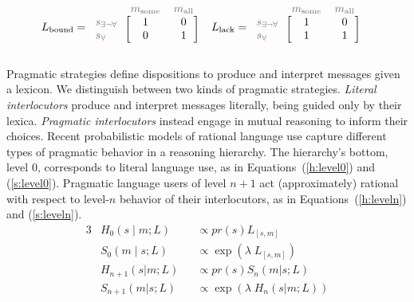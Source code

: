 \documentclass[a4paper, 11pt]{article}
\theoremstyle{Satz}
\newcommand{\state}{\ensuremath{s}\xspace}		%
\newcommand{\mystate}[1]{\ensuremath{\state_{\text{#1}}}\xspace} %
\newcommand{\mylang}[1]{\ensuremath{L_{\text{#1}}}\xspace} %
\newcommand{\messg}{\ensuremath{m}\xspace}		%
\newcommand{\mymessg}[1]{\ensuremath{\messg_{\text{#1}}}\xspace} %
\newcommand{\ssome}{\mystate{\ensuremath{\exists\neg\forall}}}
\newcommand{\sall}{\mystate{\ensuremath{\forall}}}
\newcommand{\msome}{\mymessg{some}}
\newcommand{\mall}{\mymessg{all}}
\newcommand{\Lbound}{\mylang{bound}}
\newcommand{\Llack}{\mylang{lack}}
\newcommand{\mygray}[1]{{\textcolor{mygray}{#1}}}
\begin{document}
\begin{align*}
  \Lbound & = \begin{blockarray}{lcc}
    & \mygray{\msome} & \mygray{\mall} \\
    \begin{block}{l[cc]}
      \mygray{\ssome} & 1 & 0 \\
      \mygray{\sall}  & 0 & 1 \\
    \end{block}
  \end{blockarray} &
  \Llack & = \begin{blockarray}{lcc}
    & \mygray{\msome} & \mygray{\mall} \\
    \begin{block}{l[cc]}
      \mygray{\ssome} & 1 & 0 \\
      \mygray{\sall}  & 1 & 1 \\
    \end{block}
  \end{blockarray}
\end{align*}

Pragmatic strategies define dispositions to produce and interpret messages given a lexicon. We
distinguish between two kinds of pragmatic strategies. {\em Literal interlocutors} produce and
interpret messages literally, being guided only by their lexica. {\em Pragmatic interlocutors}
instead engage in mutual reasoning to inform their choices. Recent probabilistic models of
rational language use
\citep{frank+goodman:2012,FrankeJager2015:Probabilistic-p,GoodmanFrank2016:Pragmatic-Langu}
capture different types of pragmatic behavior in a reasoning hierarchy. The hierarchy's bottom,
level $0$, corresponds to literal language use, as in Equations~(\ref{h:level0}) and
(\ref{s:level0}). Pragmatic language users of level $n + 1$ act (approximately) rational with
respect to level-$n$ behavior of their interlocutors, as in Equations~(\ref{h:leveln}) and
(\ref{s:leveln}).
\begin{alignat}{3}
&H_{0}(s \mid m;L) &&\propto pr(s) L_{[s,m]} \label{h:level0}\\
&S_{0}(m \mid s;L) &&\propto \exp(\lambda \; L_{[s,m]}) \label{s:level0}\\
&H_{n+1}(s|m;L) &&\propto pr(s) S_{n}(m|s;L) \label{h:leveln}\\
&S_{n+1}(m|s;L) &&\propto  \exp(\lambda \; H_{n}(s|m;L)) \label{s:leveln}
\end{alignat}
\end{document}

